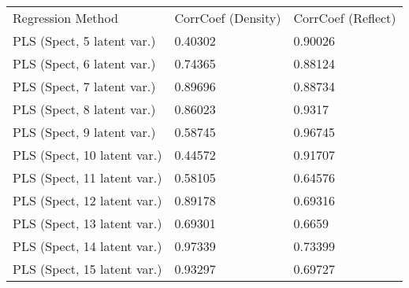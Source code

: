 \begin{table}[!hb]
	\centering
	\begin{tabular}{lll}
		Regression Method		& CorrCoef (Density)	& CorrCoef (Reflect)\\
		PLS (Spect, 5 latent var.)	& 0.40302		& 0.90026\\
		PLS (Spect, 6 latent var.)	& 0.74365		& 0.88124\\
		PLS (Spect, 7 latent var.)	& 0.89696		& 0.88734\\
		PLS (Spect, 8 latent var.)	& 0.86023		& 0.9317\\
		PLS (Spect, 9 latent var.)	& 0.58745		& 0.96745\\
		PLS (Spect, 10 latent var.)	& 0.44572		& 0.91707\\
		PLS (Spect, 11 latent var.)	& 0.58105		& 0.64576\\
		PLS (Spect, 12 latent var.)	& 0.89178		& 0.69316\\
		PLS (Spect, 13 latent var.)	& 0.69301		& 0.6659\\
		PLS (Spect, 14 latent var.)	& 0.97339		& 0.73399\\
		PLS (Spect, 15 latent var.)	& 0.93297		& 0.69727\\
	\end{tabular}
\end{table}
